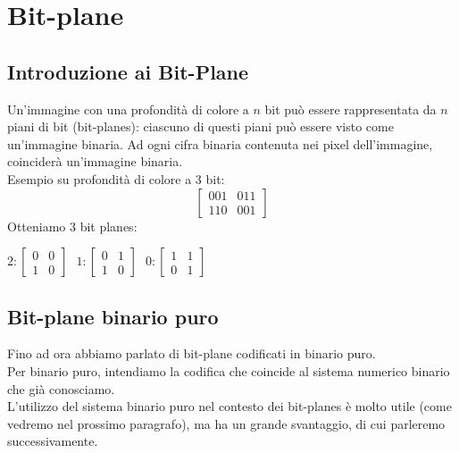 \documentclass{report}
\begin{document}
	\chapter{Bit-plane}
	\section{Introduzione ai Bit-Plane}
	Un'immagine con una profondità di colore a $n$ bit può essere rappresentata da $n$ piani di bit (bit-planes): ciascuno di questi piani può essere visto come un'immagine binaria. Ad ogni cifra binaria contenuta nei pixel dell'immagine, coinciderà un'immagine binaria.\\
	Esempio su profondità di colore a 3 bit:
	$$
	\begin{bmatrix}
		001 & 011 \\
		110 & 001 
	\end{bmatrix}
	$$
	Otteniamo 3 bit planes:
	\begin{center}
				    
		$ 2:
		\begin{bmatrix}
			0 & 0 \\
			1 & 0 
		\end{bmatrix}
		$$ \ \ \ 1:
		\begin{bmatrix}
			0 & 1 \\
			1 & 0 
		\end{bmatrix}
		$$ \ \ \ 0:
		\begin{bmatrix}
			1 & 1 \\
			0 & 1 
		\end{bmatrix}
		$
	\end{center}
	\section{Bit-plane binario puro}
	Fino ad ora abbiamo parlato di bit-plane codificati in binario puro.\\
	Per binario puro, intendiamo la codifica che coincide al sistema numerico binario che già conosciamo. \\
	L'utilizzo del sistema binario puro nel contesto dei bit-planes è molto utile (come vedremo nel prossimo paragrafo), ma ha un grande svantaggio, di cui parleremo successivamente.
		
\end{document}
